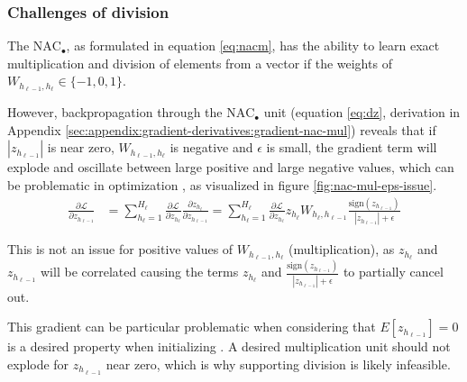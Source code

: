 \subsubsection{Challenges of division} \label{sssec:nac-mul}

The $\text{NAC}_{\bullet}$, as formulated in equation \ref{eq:nacm}, has the ability to learn exact multiplication and division of elements from a vector if the weights of $W_{h_{\ell-1},h_\ell} \in \{-1, 0, 1\}$.

However, backpropagation through the $\text{NAC}_{\bullet}$ unit (equation \ref{eq:dz}, derivation in Appendix \ref{sec:appendix:gradient-derivatives:gradient-nac-mul}) reveals that if $|z_{h_{\ell-1}}|$ is near zero, $W_{h_{\ell-1},h_\ell}$ is negative and $\epsilon$ is small, the gradient term will explode and oscillate between large positive and large negative values, which can be problematic in optimization \cite{adam-optimization}, as visualized in figure \ref{fig:nac-mul-eps-issue}.
\begin{align}
\frac{\partial \mathcal{L}}{\partial z_{h_{\ell-1}}} &= \sum_{h_\ell = 1}^{H_\ell} \frac{\partial \mathcal{L}}{\partial z_{h_\ell}} \frac{\partial z_{h_\ell}}{\partial z_{h_{\ell-1}}} = \sum_{h_\ell = 1}^{H_\ell} \frac{\partial \mathcal{L}}{\partial z_{h_\ell}} z_{h_\ell} W_{h_\ell, h_{\ell-1}} \frac{\mathrm{sign}(z_{h_{\ell-1}})}{|z_{h_{\ell-1}}| + \epsilon}\label{eq:dz}
\end{align}

This is not an issue for positive values of $W_{h_{\ell-1},h_\ell}$ (multiplication), as $z_{h_{\ell}}$ and $z_{h_{\ell-1}}$ will be correlated causing the terms $z_{h_\ell}$ and $\frac{\mathrm{sign}(z_{h_{\ell-1}})}{|z_{h_{\ell-1}}| + \epsilon}$ to partially cancel out.

This gradient can be particular problematic when considering that $E[z_{h_{\ell-1}}] = 0$ is a desired property when initializing \cite{glorot-initialization}.
A desired multiplication unit should not explode for $z_{h_{\ell-1}}$ near zero, which is why supporting division is likely infeasible.

